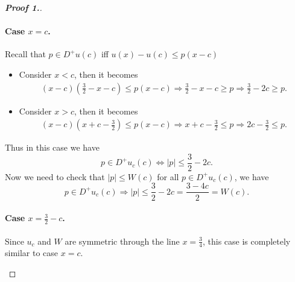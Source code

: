 \documentclass[12pt, oneside]{amsart}  	%
\begin{document}
\begin{proof}[\textbf{Proof 1.}]
\begin{itemize}
\paragraph{\textbf{Case $x = c$.}} Recall that $p\in D^+u(c)$ iff $u(x) - u(c) \leq p(x-c)$
\begin{itemize}
\item Consider $x<c$, then it becomes
\begin{align*}
(x-c)\left(\frac{3}{2}-x-c\right) \leq p(x-c) \Longrightarrow \frac{3}{2}-x-c \geq p \Longrightarrow \frac{3}{2} - 2c\geq p.
\end{align*}
\item Consider $x>c$, then it becomes
\begin{align*}
(x-c)\left(x+c -\frac{3}{2}\right) \leq p(x-c) \Longrightarrow x+c -\frac{3}{2}\leq p \Longrightarrow 2c - \frac{3}{2}\leq p.
\end{align*}
\end{itemize}
Thus in this case we have
\begin{equation*}
p\in D^+u_c(c) \Longleftrightarrow |p|\leq \frac{3}{2}-2c.
\end{equation*}
Now we need to check that $|p|\leq W(c)$ for all $p\in D^+u_c(c)$, we have
\begin{equation*}
p\in D^+u_c(c) \Longrightarrow |p|\leq \frac{3}{2}-2c  = \frac{3-4c}{2} = W(c).
\end{equation*}
\vspace*{0.2cm}


\paragraph{\textbf{Case $x = \frac{3}{2}-c$.}} 
Since $u_c$ and $W$ are symmetric through the line $x = \frac{3}{4}$, this case is completely similar to case $x= c$.
\end{itemize}
\end{proof}
\end{document}
